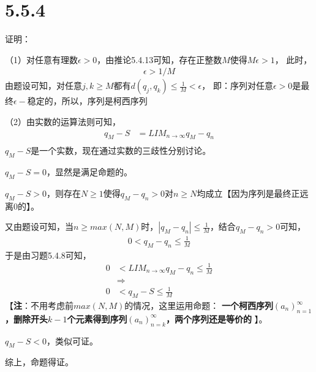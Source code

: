 \documentclass{article}
\theoremstyle{mystyle}
\begin{document}
\section*{5.5.4}

证明：

（1）对任意有理数$\epsilon > 0$，由推论5.4.13可知，存在正整数$M$使得$M\epsilon > 1$，
此时，
\begin{align*}
  \epsilon > 1/M
\end{align*}
由题设可知，对任意$j,k \geq M$都有$d(q_j,q_k) \leq \frac{1}{M} < \epsilon$，
即：序列对任意$\epsilon > 0$是最终$\epsilon -$稳定的，所以，序列是柯西序列

（2）由实数的运算法则可知，
\begin{align*}
  q_M - S & = LIM_{n\rightarrow \infty}q_M - q_n \\
\end{align*}
$q_M - S$是一个实数，现在通过实数的三歧性分别讨论。

$q_M - S = 0$，显然是满足命题的。

$q_M - S > 0$，则存在$N \geq 1$使得$q_M - q_n > 0$对$n \geq N$均成立【因为序列是最终正远离0的】。

又由题设可知，当$n \geq max(N, M)$时，$|q_M - q_n| \leq \frac{1}{M}$，结合$q_M - q_n > 0$可知，
\begin{align*}
  0 < q_M - q_n \leq \frac{1}{M}
\end{align*}
于是由习题5.4.8可知，
\begin{align*}
  0 & < LIM_{n\rightarrow \infty}q_M - q_n  \leq \frac{1}{M} \\
    & \Rightarrow                                            \\
  0 & < q_M - S                             \leq \frac{1}{M}
\end{align*}
【\textbf{注}：不用考虑前$max(N,M)$的情况，这里运用命题：
\textbf{一个柯西序列$(a_n)_{n=1}^\infty$，删除开头$k-1$个元素得到序列$(a_n)_{n=k}^\infty$，两个序列还是等价的} 】。

$q_M - S < 0$，类似可证。

综上，命题得证。
\end{document}
